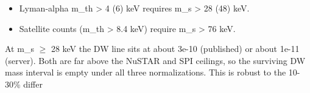 \documentclass[11pt,a4paper]{article}
\begin{document}
\begin{itemize}
  \item Lyman-alpha m\_th \textgreater{} 4 (6) keV requires m\_s \textgreater{} 28 (48) keV.
  \item Satellite counts (m\_th \textgreater{} 8.4 keV) require m\_s \textgreater{} 76 keV.
\end{itemize}
At m\_s $\geq$ 28 keV the DW line sits at about 3e-10 (published) or about 1e-11 (server). Both are far above the NuSTAR and SPI ceilings, so the surviving DW mass interval is empty under all three normalizations. This is robust to the 10-30\% differ
\end{document}
